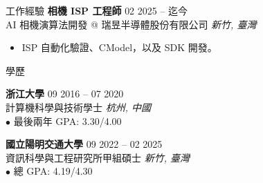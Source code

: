 \documentclass{resume}
\begin{document}
\vspace{-1em}
\begin{rSection}{工作經驗}
    {\bf 相機 ISP 工程師} \hfill {02 2025 -- 迄今}\\
    {AI 相機演算法開發 @ 瑞昱半導體股份有限公司} \hfill \textit{新竹, 臺灣}\\
    \begin{itemize}
        \item ISP 自動化驗證、CModel，以及 SDK 開發。
    \end{itemize}
\end{rSection}

\vspace{-1em}
\begin{rSection}{學歷}

{\bf 浙江大學} \hfill {09 2016 -- 07 2020}\\
計算機科學與技術學士 \hfill \textit{杭州, 中國}\\
$\bullet$ 最後兩年 GPA: 3.30/4.00

{\bf 國立陽明交通大學} \hfill {09 2022 -- 02 2025}\\
資訊科學與工程研究所甲組碩士 \hfill \textit{新竹, 臺灣}\\
$\bullet$ 總 GPA: 4.19/4.30

\end{rSection}
\end{document}
